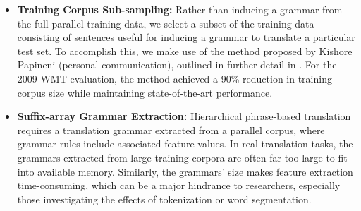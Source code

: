 \documentclass[11pt]{article}
\newcommand{\ignore}[1]{}
\begin{document}
\begin{itemize}
\item \textbf{Training Corpus Sub-sampling:} Rather than inducing a grammar from the full parallel training data, we select a subset of the training data consisting of sentences useful for inducing a grammar to translate a particular test set. To accomplish this, we make use of the method proposed by Kishore Papineni (personal communication), outlined in further detail in \cite{Joshua-WMT}. For the 2009 WMT evaluation, the method achieved a 90\% reduction in training corpus size while maintaining state-of-the-art performance.


\item \textbf{Suffix-array Grammar Extraction:} Hierarchical phrase-based translation requires a translation grammar extracted from a parallel corpus, where grammar rules include associated feature values. In real translation tasks, the grammars extracted from large training corpora are often far too large to fit into available memory. Similarly, the grammars' size makes feature extraction time-consuming, which can be a major hindrance to researchers, especially those investigating the effects of tokenization or word segmentation.



\end{itemize}
\end{document}
